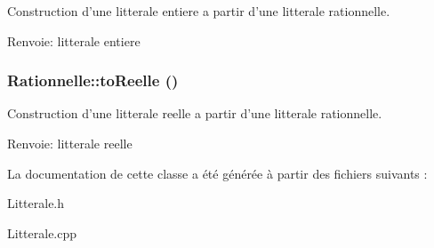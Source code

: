 Construction d'une litterale entiere a partir d'une litterale rationnelle. 

\begin{Desc}
\item[Renvoie:]litterale entiere \end{Desc}
\hypertarget{class_rationnelle_ae003cf8f8f8fd3f8ca25833019293c7}{
\subsubsection[{toReelle}]{ Rationnelle::toReelle ()}}
\label{class_rationnelle_ae003cf8f8f8fd3f8ca25833019293c7}


Construction d'une litterale reelle a partir d'une litterale rationnelle. 

\begin{Desc}
\item[Renvoie:]litterale reelle \end{Desc}


La documentation de cette classe a été générée à partir des fichiers suivants :\begin{CompactItemize}
\item 
Litterale.h\item 
Litterale.cpp\end{CompactItemize}
